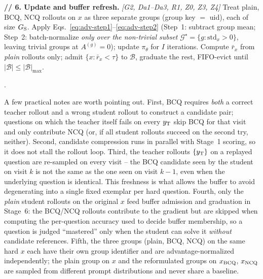 \begin{algorithm*}[!htbp]
\textbf{// 6. Update and buffer refresh.} \textit{[G2, Da1--Da3, R1, Z0, Z3, Z4]}\;
Treat plain, BCQ, NCQ rollouts on $x$ as three separate groups (group key $=$ uid), each of size $G_{\rm S}$. Apply Eqs.~\eqref{eq:adv-step1}--\eqref{eq:adv-step2} (Step~1: subtract group mean; Step~2: batch-normalize \emph{only over the non-trivial subset} $\mathcal{G}^{\star}\!=\!\{g\!:\!\mathrm{std}_x\!>\!0\}$, leaving trivial groups at $A^{(g)}\!=\!0$); update $\pi_\theta$ for $I$ iterations.\;
Compute $\bar{r}_x$ from \emph{plain} rollouts only; admit $\{x:\bar{r}_x\!<\!\tau\}$ to $\mathcal{B}$, graduate the rest, FIFO-evict until $|\mathcal{B}|\!\leq\!|\mathcal{B}|_{\max}$.\;

.
\caption{ZPPO training step. Tags: G1--G2 from GRPO~\citep{shao2024deepseekmath}, Da1--Da3 from DAPO~\citep{yu2025dapo}, R1 from REINFORCE++~\citep{hu2025reinforce++}; Z0 marks our recipe choice on top of REINFORCE++ (zero-advantage-group exclusion); Z1--Z4 are ZPPO's contributions (BCQ, NCQ, prompt replay buffer, and their super-additive combination).}
\label{alg:zppo}
\end{algorithm*}

A few practical notes are worth pointing out. First, BCQ requires \emph{both} a correct teacher rollout and a wrong student rollout to construct a candidate pair; questions on which the teacher itself fails on every $y_{\rm T}$ skip BCQ for that visit and only contribute NCQ (or, if all student rollouts succeed on the second try, neither). Second, candidate compression runs in parallel with Stage~1 scoring, so it does not stall the rollout loop. Third, the teacher rollouts $\{y_{\rm T}\}$ on a replayed question are re-sampled on every visit -- the BCQ candidate seen by the student on visit $k$ is not the same as the one seen on visit $k\!-\!1$, even when the underlying question is identical. This freshness is what allows the buffer to avoid degenerating into a single fixed exemplar per hard question. Fourth, only the \emph{plain} student rollouts on the original $x$ feed buffer admission and graduation in Stage~6: the BCQ/NCQ rollouts contribute to the gradient but are skipped when computing the per-question accuracy used to decide buffer membership, so a question is judged ``mastered'' only when the student can solve it \emph{without} candidate references. Fifth, the three groups (plain, BCQ, NCQ) on the same hard $x$ each have their own group identifier and are advantage-normalized independently; the plain group on $x$ and the reformulated groups on $x_{\rm BCQ}$, $x_{\rm NCQ}$ are sampled from different prompt distributions and never share a baseline.

